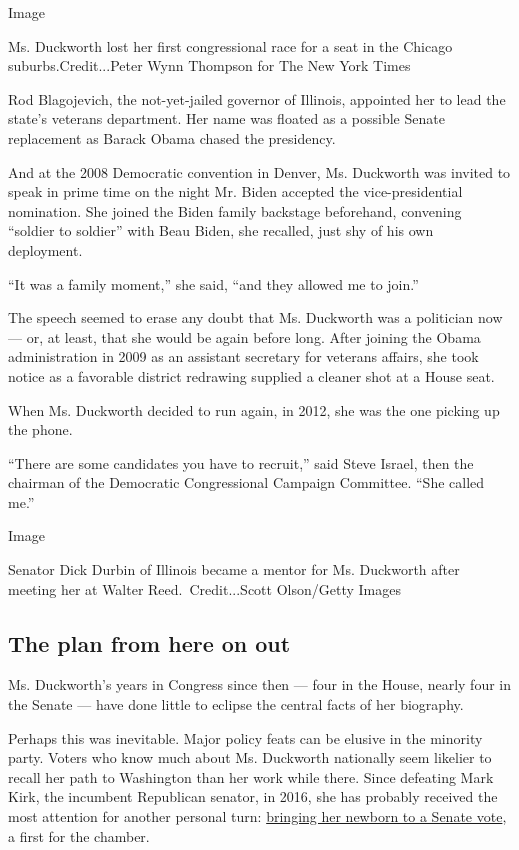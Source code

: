 Image

Ms. Duckworth lost her first congressional race for a seat in the
Chicago suburbs.Credit...Peter Wynn Thompson for The New York Times

Rod Blagojevich, the not-yet-jailed governor of Illinois, appointed her
to lead the state's veterans department. Her name was floated as a
possible Senate replacement as Barack Obama chased the presidency.

And at the 2008 Democratic convention in Denver, Ms. Duckworth was
invited to speak in prime time on the night Mr. Biden accepted the
vice-presidential nomination. She joined the Biden family backstage
beforehand, convening ``soldier to soldier'' with Beau Biden, she
recalled, just shy of his own deployment.

``It was a family moment,'' she said, ``and they allowed me to join.''

The speech seemed to erase any doubt that Ms. Duckworth was a politician
now --- or, at least, that she would be again before long. After joining
the Obama administration in 2009 as an assistant secretary for veterans
affairs, she took notice as a favorable district redrawing supplied a
cleaner shot at a House seat.

When Ms. Duckworth decided to run again, in 2012, she was the one
picking up the phone.

``There are some candidates you have to recruit,'' said Steve Israel,
then the chairman of the Democratic Congressional Campaign Committee.
``She called me.''

Image

Senator Dick Durbin of Illinois became a mentor for Ms. Duckworth after
meeting her at Walter Reed.~Credit...Scott Olson/Getty Images

\hypertarget{the-plan-from-here-on-out}{%
\subsection{The plan from here on out}\label{the-plan-from-here-on-out}}

Ms. Duckworth's years in Congress since then --- four in the House,
nearly four in the Senate --- have done little to eclipse the central
facts of her biography.

Perhaps this was inevitable. Major policy feats can be elusive in the
minority party. Voters who know much about Ms. Duckworth nationally seem
likelier to recall her path to Washington than her work while there.
Since defeating Mark Kirk, the incumbent Republican senator, in 2016,
she has probably received the most attention for another personal turn:
\href{https://www.nytimes.com/2018/04/19/us/politics/baby-duckworth-senate-floor.html}{bringing
her newborn to a Senate vote}, a first for the chamber.

